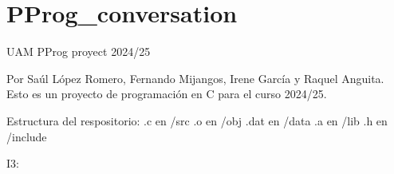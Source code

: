 \chapter{PProg\+\_\+conversation}
\hypertarget{md_README}{}\label{md_README}
\label{md_README_autotoc_md0}%
%
UAM PProg proyect 2024/25

Por Saúl López Romero, Fernando Mijangos, Irene García y Raquel Anguita. Esto es un proyecto de programación en C para el curso 2024/25.

Estructura del respositorio\+: .c en /src .o en /obj .dat en /data .a en /lib .h en /include

I3\+: 